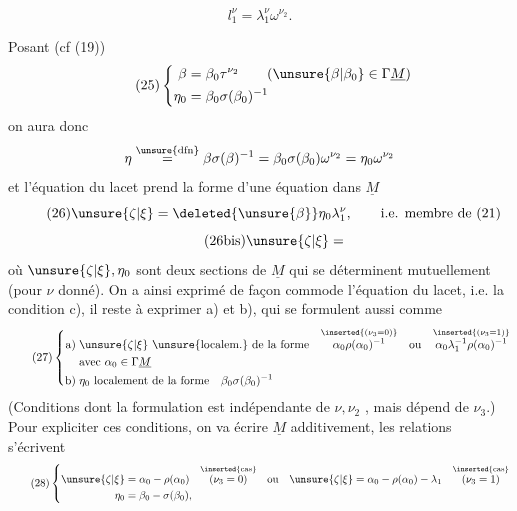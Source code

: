 
\[
\tag{24} l_1^\nu=\lambda_1^\nu\omega^{\nu_2}.
\]

Posant (cf (19))
\[
\tag{25}
\left\{\begin{aligned}
\beta&=\beta_0\tau^{\nu_2}\qquad(\unsure{\beta|\beta_0}\in\Gamma\underline M)\\
\eta_0&=\beta_0\sigma(\beta_0)^{-1}
\end{aligned}\right.
\]
on aura donc
\[
\eta\overset{\unsure{\mathrm{dfn}}}{=}
\beta\sigma(\beta)^{-1}
=\beta_0\sigma(\beta_0)\omega^{\nu_2}
=\eta_0\omega^{\nu_2}
\]
et l'équation du lacet prend la forme
d'une équation dans $\underline M$
\[
\tag{26}
\unsure{\zeta|\xi}=\deleted{\unsure{\beta}}\eta_0\lambda_1^\nu,
\qquad\text{i.e. membre de (21)}
\]
\[
\tag{26bis}\unsure{\zeta|\xi}=
\]
où $\unsure{\zeta|\xi},\eta_0$ sont deux sections de $\underline M$ qui
se déterminent mutuellement (pour $\nu$
donné). On a ainsi exprimé de façon
commode l'équation du lacet, i.e. la
condition c), il reste à exprimer a) et b),
qui se formulent aussi comme
\[
\tag{27}
\left\{\begin{aligned}
\text{a)}\;&\unsure{\zeta|\xi}\ \text{\unsure{localem.} de la forme}\quad
\overset{\inserted{(\nu_3=0)}}{\alpha_0\rho(\alpha_0)^{-1}}
\quad\text{ou}\quad
\overset{\inserted{(\nu_3=1)}}{\alpha_0\lambda_1^{-1}\rho(\alpha_0)^{-1}}\\
&\text{avec }\alpha_0\in\Gamma\underline M\\
\text{b)}\;&\eta_0\ \text{localement de la forme}\quad\beta_0\sigma(\beta_0)^{-1}
\end{aligned}\right.
\]
(Conditions dont la formulation est indépendante
de $\nu,\nu_2$ , mais dépend  de
$\nu_3$.) Pour expliciter ces conditions, on
va écrire $\underline M$ additivement, les relations
s'écrivent
\[
\tag{28}
\left\{\begin{aligned}
\unsure{\zeta|\xi}&=\alpha_0-\rho(\alpha_0)
\quad\overset{\inserted{\text{cas}}}{(\nu_3=0)}
\quad\text{ou}\quad
\unsure{\zeta|\xi}=\alpha_0-\rho(\alpha_0)-\lambda_1
\quad\overset{\inserted{\text{cas}}}{(\nu_3=1)}\\
\eta_0&=\beta_0-\sigma(\beta_0),
\end{aligned}\right.
\]

